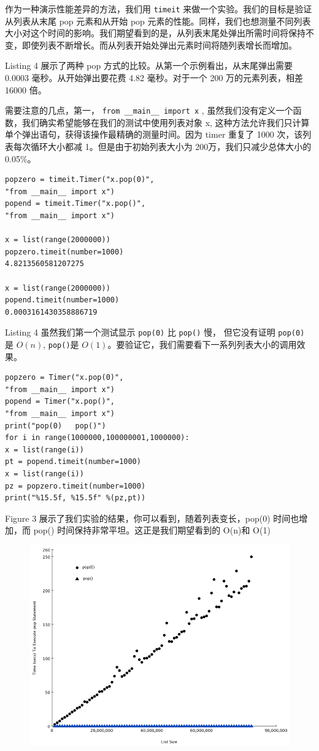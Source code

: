 作为一种演示性能差异的方法，我们用 \lstinline|timeit| 来做一个实验。我们的目标是验证从列表从末尾 pop 元素和从开始 pop 元素的性能。同样，我们也想测量不同列表大小对这个时间的影响。我们期望看到的是，从列表末尾处弹出所需时间将保持不变，即使列表不断增长。而从列表开始处弹出元素时间将随列表增长而增加。

Listing 4 展示了两种 pop 方式的比较。从第一个示例看出，从末尾弹出需要 0.0003 毫秒。从开始弹出要花费 4.82 毫秒。对于一个 200 万的元素列表，相差 16000 倍。

需要注意的几点，第一， \lstinline|from __main__ import x| , 虽然我们没有定义一个函数，我们确实希望能够在我们的测试中使用列表对象 x, 这种方法允许我们只计算单个弹出语句，获得该操作最精确的测量时间。因为 timer 重复了 1000 次，该列表每次循环大小都减 1。但是由于初始列表大小为 200万，我们只减少总体大小的 0.05\%。
\begin{lstlisting}
popzero = timeit.Timer("x.pop(0)",
"from __main__ import x")
popend = timeit.Timer("x.pop()",
"from __main__ import x")

x = list(range(2000000))
popzero.timeit(number=1000)
4.8213560581207275

x = list(range(2000000))
popend.timeit(number=1000)
0.0003161430358886719
\end{lstlisting}
Listing 4
虽然我们第一个测试显示 \lstinline|pop(0)| 比 \lstinline|pop()| 慢， 但它没有证明 \lstinline|pop(0)| 是 $O(n)$, \lstinline|pop()|是 $O(1)$。要验证它，我们需要看下一系列列表大小的调用效果。
\begin{lstlisting}
popzero = Timer("x.pop(0)",
"from __main__ import x")
popend = Timer("x.pop()",
"from __main__ import x")
print("pop(0)   pop()")
for i in range(1000000,100000001,1000000):
x = list(range(i))
pt = popend.timeit(number=1000)
x = list(range(i))
pz = popzero.timeit(number=1000)
print("%15.5f, %15.5f" %(pz,pt))
\end{lstlisting}
Figure 3 展示了我们实验的结果，你可以看到，随着列表变长，pop(0) 时间也增加，而 pop() 时间保持非常平坦。这正是我们期望看到的 O(n)和 O(1)

\begin{figure}
\centering
\includegraphics[width=5in]{images/poptime.png}
\end{figure}


